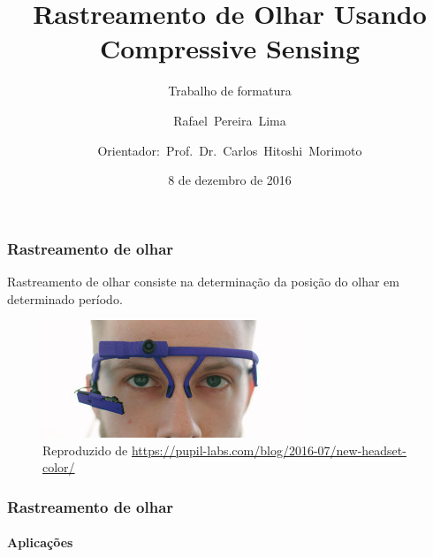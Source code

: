 \documentclass[11pt]{beamer}
\author{\mbox{Rafael Pereira Lima} \and
		\mbox{Orientador: Prof. Dr. Carlos Hitoshi Morimoto}}
\title{Rastreamento de Olhar Usando Compressive Sensing}
\subtitle{Trabalho de formatura}
\institute{IME-USP}
\date{8 de dezembro de 2016}
\begin{document}
\begin{frame}
\titlepage
\end{frame}

\begin{frame}
\frametitle{Rastreamento de olhar}
Rastreamento de olhar consiste na determinação da posição do olhar em determinado período.
\begin{figure}
\includegraphics[scale=1]{imagens/dmk-headset.jpg}
\caption{\tiny{Reproduzido de \url{https://pupil-labs.com/blog/2016-07/new-headset-color/}}}
\end{figure}
\end{frame}

\begin{frame}
\frametitle{Rastreamento de olhar}
\framesubtitle{Aplicações}
\begin{figure}
\end{figure}
\end{frame}
\end{document}
